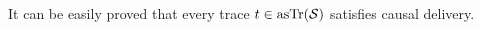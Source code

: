 It can be easily proved that every trace $t\in \mathrm{asTr}({\mathcal{S}})$ satisfies causal delivery. %


